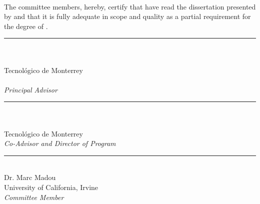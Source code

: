 \documentclass[
11pt, 
oneside,
english,
onehalfspacing,
onehalfspacing,
parskip,
headsepline,
]{MastersDoctoralThesis}
\begin{document}
\begin{titlepage}
\begin{center}
\vfill

\examDate\\[4cm]
 
\vfill
\end{center}
\end{titlepage}


%

\begin{committee}
The committee members, hereby, certify that have read the dissertation presented by \authorname \text{ } and that it is fully adequate in scope and quality as a partial requirement for the degree of \degreename.

\begin{flushright} \large

\bigskip
\bigskip
\medskip

\noindent \rule[0.0em]{15em}{0.5pt}\\ %
\supname\\
Tecnológico de Monterrey\\
\deptname\\
\emph{Principal Advisor}

\bigskip
\bigskip
\medskip

\noindent \rule[0.0em]{15em}{0.5pt}\\ %
\cosupname\\
Tecnológico de Monterrey\\
\emph{Co-Advisor and Director of Program}

\bigskip
\bigskip
\medskip

\noindent \rule[0.0em]{15em}{0.5pt}\\ %
Dr. Marc Madou\\
University of California, Irvine\\
\emph{Committee Member}

\bigskip
\bigskip
\medskip


\end{flushright}
\end{committee}
\end{document}
